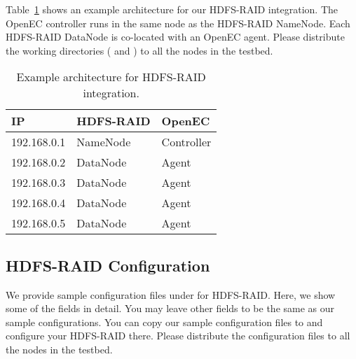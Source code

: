 \documentclass[letterpaper,12pt]{article}
\newcommand{\openec}{{\sf\small OpenEC}\xspace}
\begin{document}
Table~\ref{tab:hdfsraidarch} shows an example architecture for our HDFS-RAID
integration.  The \openec controller runs in the same node as the HDFS-RAID
NameNode.  Each HDFS-RAID DataNode is co-located with an \openec agent. Please
distribute the working directories ( and
) to all the nodes in the testbed.

\begin{table}[h]
\centering
\footnotesize
\renewcommand{\arraystretch}{1.1}
\begin{tabular}{|l|l|l|}
\hline
IP & HDFS-RAID & OpenEC \\
\hline
\hline
192.168.0.1 & NameNode & Controller \\
\hline
192.168.0.2 & DataNode & Agent \\
\hline
192.168.0.3 & DataNode & Agent \\
\hline
192.168.0.4 & DataNode & Agent \\
\hline
192.168.0.5 & DataNode & Agent \\
\hline
\end{tabular}
\vspace{-3pt}
\caption{Example architecture for HDFS-RAID integration.}
\label{tab:hdfsraidarch}
\end{table}

\subsection{HDFS-RAID Configuration}

We provide sample configuration files 
under  for HDFS-RAID. 
Here, we show some of the fields in detail. You may leave other fields to be
the same as our sample configurations.  You can copy our sample configuration
files to  and configure your HDFS-RAID there. Please
distribute the configuration files to all the nodes in the testbed. 
\end{document}
